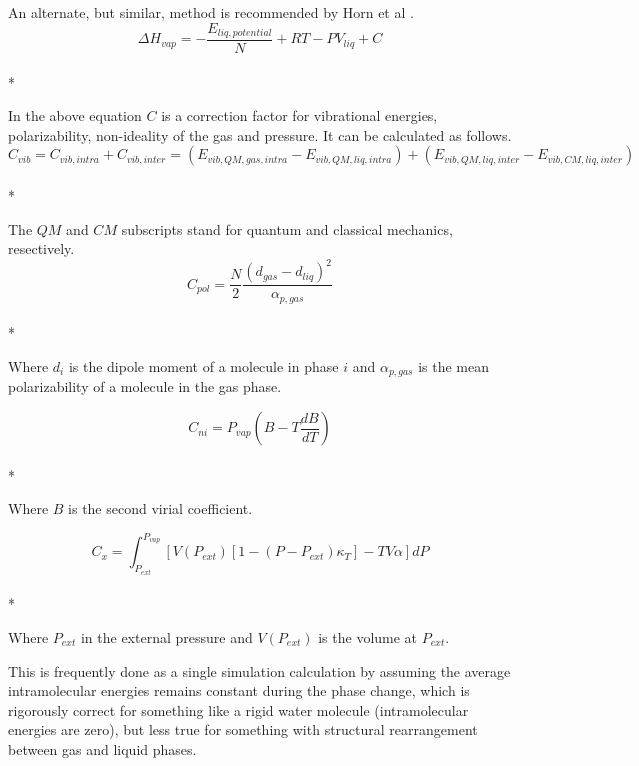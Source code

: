 \documentclass[aps,pre,twocolumn,nofootinbib,superscriptaddress,linenumbers,10pt, draft,tightenlines]{revtex4-1}
\begin{document}
An alternate, but similar, method is recommended by Horn et al \cite{horn}.
\begin{equation}\Delta H_{vap} = -\frac{E_{liq, potential}}{N} + R T - P V_{liq} + C\end{equation}\\*

In the above equation $C$ is a correction factor for vibrational energies, polarizability, non-ideality of the gas and pressure. It can be calculated as follows.
\begin{equation}C_{vib} = C_{vib,intra} + C_{vib,inter} = \left(E_{vib,QM,gas,intra} - E_{vib,QM,liq,intra}\right) + \left(E_{vib,QM,liq,inter} - E_{vib,CM,liq,inter}\right)\end{equation}\\*

The $QM$ and $CM$ subscripts stand for quantum and classical mechanics, resectively. 
\begin{equation}C_{pol} = \frac{N}{2} \frac{\left(d_{gas} - d_{liq}\right)^2}{\alpha_{p,gas}}\end{equation}\\*

Where $d_i$ is the dipole moment of a molecule in phase $i$ and $\alpha_{p,gas}$ is the mean polarizability of a molecule in the gas phase.

\begin{equation}C_{ni} = P_{vap} \left(B - T \frac{dB}{dT}\right)\end{equation}\\*

Where $B$ is the second virial coefficient.

\begin{equation}C_x = \int_{P_{ext}}^{P_{vap}} \left[V\left(P_{ext}\right)\left[1 - \left(P - P_{ext}\right) \kappa_T\right] - T V \alpha\right] dP\end{equation}\\*

Where $P_{ext}$ in the external pressure and $V\left(P_{ext}\right)$ is the volume at $P_{ext}$. 

This is frequently done as a single simulation calculation by assuming
the average intramolecular energies remains constant during the phase
change, which is rigorously correct for something like a rigid water
molecule (intramolecular energies are zero), but less true for
something with structural rearrangement between gas and liquid phases. 
\end{document}
